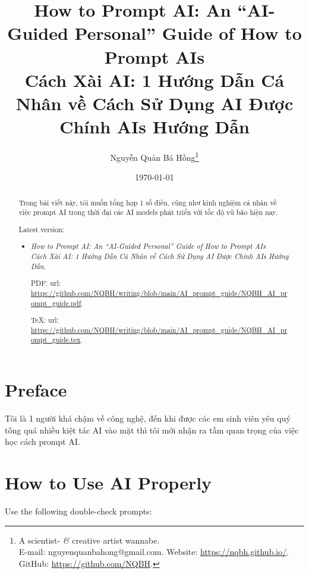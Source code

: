 \documentclass{article}
\title{How to Prompt AI: An ``AI-Guided Personal'' Guide of How to Prompt AIs\\Cách Xài AI: 1 Hướng Dẫn Cá Nhân về Cách Sử Dụng AI Được Chính AIs Hướng Dẫn}
\author{Nguyễn Quản Bá Hồng\footnote{A scientist- {\it\&} creative artist wannabe.\\E-mail: {\sf nguyenquanbahong@gmail.com}. Website: \url{https://nqbh.github.io/}. GitHub: \url{https://github.com/NQBH}.}}
\date{\today}
\begin{document}
\maketitle
\begin{abstract}
	Trong bài viết này, tôi muốn tổng hợp 1 số điều, cũng như kinh nghiệm cá nhân về việc prompt AI trong thời đại các AI models phát triển với tốc độ vũ bão hiện nay.
	
	Latest version:
	\begin{itemize}
		\item {\it How to Prompt AI: An ``AI-Guided Personal'' Guide of How to Prompt AIs\\Cách Xài AI: 1 Hướng Dẫn Cá Nhân về Cách Sử Dụng AI Được Chính AIs Hướng Dẫn}.
		
		PDF: {\sc url}: \url{https://github.com/NQBH/writing/blob/main/AI_prompt_guide/NQBH_AI_prompt_guide.pdf}.
		
		\TeX: {\sc url}: \url{https://github.com/NQBH/writing/blob/main/AI_prompt_guide/NQBH_AI_prompt_guide.tex}.
	\end{itemize}
\end{abstract}
\tableofcontents


\section{Preface}
Tôi là 1 người khá chậm về công nghệ, đến khi được các em sinh viên yêu quý tống quá nhiều kiệt tác AI vào mặt thì tôi mới nhận ra tầm quan trọng của việc học cách prompt AI.


\section{How to Use AI Properly}

Use the following double-check prompts:
\end{document}
